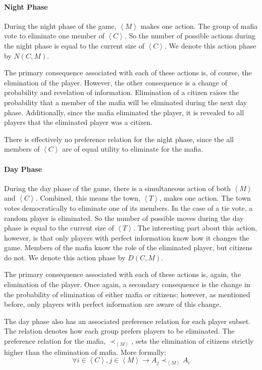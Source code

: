 \documentclass[12pt]{article}
\begin{document}
\paragraph{Night Phase}
During the night phase of the game, $\left<M\right>$ makes one action. The group of mafia vote to eliminate one member of $\left<C\right>$. So the number of possible actions during the night phase is equal to the current size of $\left<C\right>$. We denote this action phase by $N\left(C,M\right)$.

The primary consequence associated with each of these actions is, of course, the elimination of the player. However, the other consequence is a change of probability and revelation of information. Elimination of a citizen raises the probability that a member of the mafia will be eliminated during the next day phase. Additionally, since the mafia eliminated the player, it is revealed to all players that the eliminated player was a citizen.

There is effectively no preference relation for the night phase, since the all members of $\left<C\right>$ are of equal utility to eliminate for the mafia.

\paragraph{Day Phase}
During the day phase of the game, there is a simultaneous action of both $\left<M\right>$ and $\left<C\right>$. Combined, this means the town, $\left<T\right>$, makes one action. The town votes democratically to eliminate one of its members. In the case of a tie vote, a random player is eliminated. So the number of possible moves during the day phase is equal to the current size of $\left<T\right>$. The interesting part about this action, however, is that only players with perfect information know how it changes the game. Members of the mafia know the role of the eliminated player, but citizens do not. We denote this action phase by $D\left(C,M\right)$.

The primary consequence associated with each of these actions is, again, the elimination of the player. Once again, a secondary consequence is the change in the probability of elimination of either mafia or citizens; however, as mentioned before, only players with perfect information are aware of this change.

The day phase also has an associated preference relation for each player subset. The relation denotes how each group prefers players to be eliminated. The preference relation for the mafia, $\prec_{\left<M\right>}$, sets the elimination of citizens strictly higher than the elimination of mafia. More formally: 
\begin{equation}
\forall i \in \left<C\right>, j \in \left<M\right> \rightarrow A_j \prec_{\left<M\right>} A_i
\end{equation}
\end{document}
